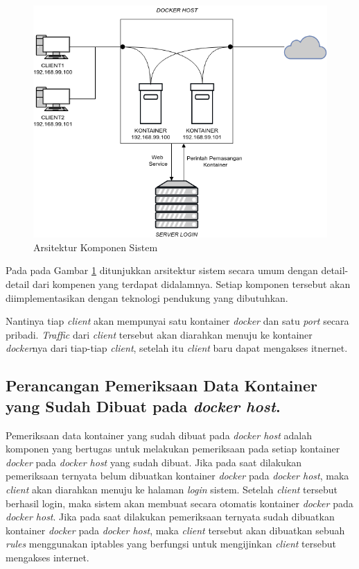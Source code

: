       \begin{figure}[H]
        \centering
        \includegraphics[width=\linewidth]{images/bab3/DIAGRAM1}
        \caption{Arsitektur Komponen Sistem}
        \label{Arsitektur Komponen Sistem}
      \end{figure}
      
    \indent Pada pada Gambar \ref{Arsitektur Komponen Sistem} ditunjukkan arsitektur sistem secara umum dengan detail-detail dari kompenen yang terdapat didalamnya. Setiap komponen tersebut akan diimplementasikan dengan teknologi pendukung yang dibutuhkan.
    
    Nantinya tiap \textit{client}  akan mempunyai satu kontainer \textit{docker} dan satu \textit{port} secara pribadi. \textit{Traffic} dari \textit{client} tersebut akan diarahkan menuju ke kontainer \textit{docker}nya dari tiap-tiap \textit{client}, setelah itu \textit{client} baru dapat mengakses itnernet.
    
    \subsection{Perancangan Pemeriksaan Data Kontainer yang Sudah Dibuat pada \textit{docker host}.}
    Pemeriksaan data kontainer yang sudah dibuat pada \textit{docker host} adalah komponen yang bertugas untuk melakukan pemeriksaan pada setiap kontainer \textit{docker} pada \textit{docker host} yang sudah dibuat. Jika pada saat dilakukan pemeriksaan ternyata belum dibuatkan kontainer \textit{docker} pada \textit{docker host}, maka \textit{client} akan diarahkan menuju ke halaman \textit{login} sistem. Setelah \textit{client} tersebut berhasil login, maka sistem akan membuat secara otomatis kontainer \textit{docker} pada \textit{docker host}. Jika pada saat dilakukan pemeriksaan ternyata sudah dibuatkan kontainer \textit{docker} pada \textit{docker host}, maka \textit{client} tersebut akan dibuatkan sebuah \textit{rules} menggunakan iptables yang berfungsi untuk mengijinkan \textit{client} tersebut mengakses internet.
    
